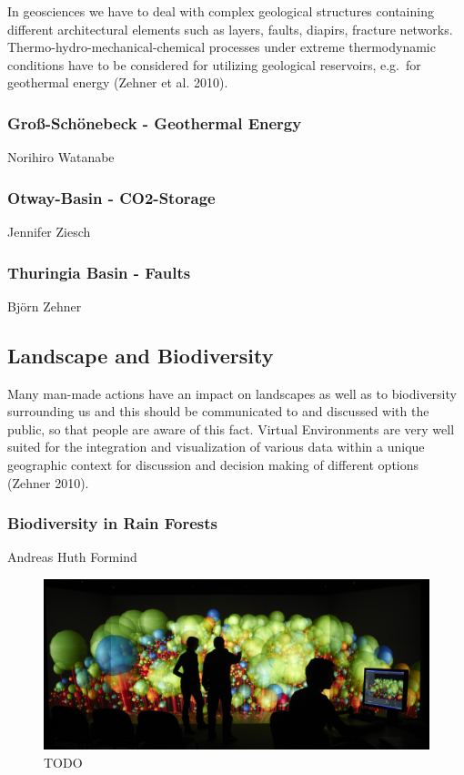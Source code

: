 In geosciences we have to deal with complex geological structures
containing different architectural elements such as layers, faults,
diapirs, fracture networks. Thermo-hydro-mechanical-chemical processes
under extreme thermodynamic conditions have to be considered for
utilizing geological reservoirs, e.g.~for geothermal energy (Zehner et
al. 2010).

\subsubsection{Groß-Schönebeck - Geothermal Energy}
\label{grouxdf-schuxf6nebeck---geothermal-energy}

Norihiro Watanabe

\subsubsection{Otway-Basin - CO2-Storage}
\label{otway-basin---co2-storage}

Jennifer Ziesch

\subsubsection{Thuringia Basin - Faults}
\label{thuringia-basin---faults}

Björn Zehner

\subsection{Landscape and Biodiversity}
\label{landscape-and-biodiversity}

Many man-made actions have an impact on landscapes as well as to
biodiversity surrounding us and this should be communicated to and
discussed with the public, so that people are aware of this fact.
Virtual Environments are very well suited for the integration and
visualization of various data within a unique geographic context for
discussion and decision making of different options (Zehner 2010).

\subsubsection{Biodiversity in Rain Forests}
\label{biodiversity-in-rain-forests}

Andreas Huth Formind \cite{kohler:98}

\begin{figure}
  \includegraphics[width=\linewidth]{images/biodiversity.jpg}
\caption{TODO}
\label{fig:biodiversity}
\end{figure}


